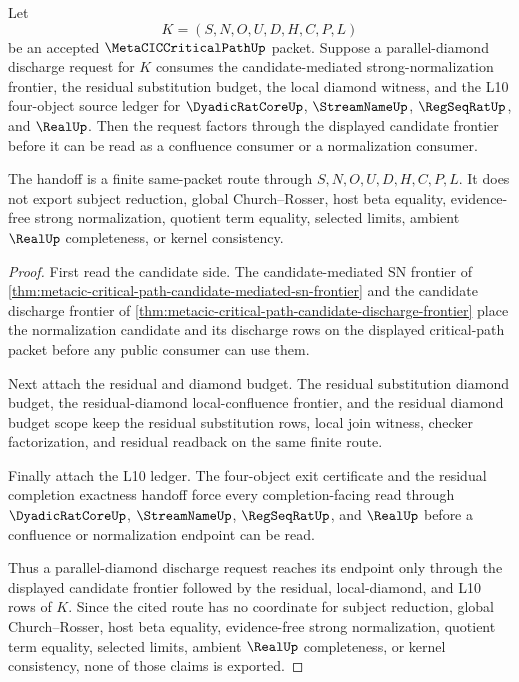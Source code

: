 \begin{theorem}
\label{thm:metacic-critical-path-parallel-diamond-frontier-handoff}
Let
$$
K=(S,N,O,U,D,H,C,P,L)
$$
be an accepted $\MetaCICCriticalPathUp$ packet. Suppose a parallel-diamond discharge request for $K$ consumes the candidate-mediated strong-normalization frontier, the residual substitution budget, the local diamond witness, and the L10 four-object source ledger for $\DyadicRatCoreUp$, $\StreamNameUp$, $\RegSeqRatUp$, and $\RealUp$. Then the request factors through the displayed candidate frontier before it can be read as a confluence consumer or a normalization consumer.

The handoff is a finite same-packet route through $S,N,O,U,D,H,C,P,L$. It does not export subject reduction, global Church--Rosser, host beta equality, evidence-free strong normalization, quotient term equality, selected limits, ambient $\RealUp$ completeness, or kernel consistency.
\end{theorem}
\begin{proof}
First read the candidate side. The candidate-mediated SN frontier of \autoref{thm:metacic-critical-path-candidate-mediated-sn-frontier} and the candidate discharge frontier of \autoref{thm:metacic-critical-path-candidate-discharge-frontier} place the normalization candidate and its discharge rows on the displayed critical-path packet before any public consumer can use them.

Next attach the residual and diamond budget. The residual substitution diamond budget, the residual-diamond local-confluence frontier, and the residual diamond budget scope keep the residual substitution rows, local join witness, checker factorization, and residual readback on the same finite route.

Finally attach the L10 ledger. The four-object exit certificate and the residual completion exactness handoff force every completion-facing read through $\DyadicRatCoreUp$, $\StreamNameUp$, $\RegSeqRatUp$, and $\RealUp$ before a confluence or normalization endpoint can be read.

Thus a parallel-diamond discharge request reaches its endpoint only through the displayed candidate frontier followed by the residual, local-diamond, and L10 rows of $K$. Since the cited route has no coordinate for subject reduction, global Church--Rosser, host beta equality, evidence-free strong normalization, quotient term equality, selected limits, ambient $\RealUp$ completeness, or kernel consistency, none of those claims is exported.
\end{proof}

